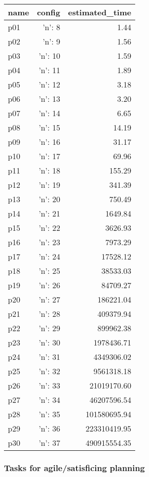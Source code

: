 \documentclass{article}
\begin{document}
                            \begin{center}
                            \scriptsize
                            \begin{tabular}{@{}l|r|r@{}}
                            name & config & estimated\_time\\\midrule
                              p01&{'n': 8}&1.44\\
  p02&{'n': 9}&1.56\\
  p03&{'n': 10}&1.59\\
  p04&{'n': 11}&1.89\\
  p05&{'n': 12}&3.18\\
  p06&{'n': 13}&3.20\\
  p07&{'n': 14}&6.65\\
  p08&{'n': 15}&14.19\\
  p09&{'n': 16}&31.17\\
  p10&{'n': 17}&69.96\\
  p11&{'n': 18}&155.29\\
  p12&{'n': 19}&341.39\\
  p13&{'n': 20}&750.49\\
  p14&{'n': 21}&1649.84\\
  p15&{'n': 22}&3626.93\\
  p16&{'n': 23}&7973.29\\
  p17&{'n': 24}&17528.12\\
  p18&{'n': 25}&38533.03\\
  p19&{'n': 26}&84709.27\\
  p20&{'n': 27}&186221.04\\
  p21&{'n': 28}&409379.94\\
  p22&{'n': 29}&899962.38\\
  p23&{'n': 30}&1978436.71\\
  p24&{'n': 31}&4349306.02\\
  p25&{'n': 32}&9561318.18\\
  p26&{'n': 33}&21019170.60\\
  p27&{'n': 34}&46207596.54\\
  p28&{'n': 35}&101580695.94\\
  p29&{'n': 36}&223310419.95\\
  p30&{'n': 37}&490915554.35
                            \end{tabular}
                            \end{center}
                    

                                \subsubsection*{Tasks for agile/satisficing planning}
                                
\end{document}
